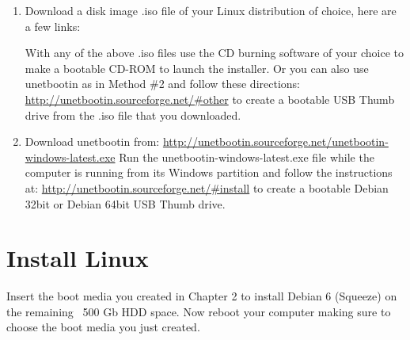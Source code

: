 \documentclass[12pt,notitlepage,onecolumn,oneside,openany]{memoir}
\begin{document}
\begin{enumerate}
\item \textsf{Download a disk image .iso file of your Linux distribution of choice, here are a few links:} 



\textsf{With any of the above .iso files use the CD burning software of your choice to make a bootable CD-ROM to launch the installer. Or you can also use unetbootin as in Method \#2 and follow these directions:} \newline
\url{http://unetbootin.sourceforge.net/#other} \newline
\textsf{to create a bootable USB Thumb drive from the .iso file that you downloaded.}

\item \textsf{Download unetbootin from:} \newline
\url{http://unetbootin.sourceforge.net/unetbootin-windows-latest.exe}\newline
\textsf{Run the unetbootin-windows-latest.exe file while the computer is running from its Windows partition and follow the instructions at:} \newline
\url{http://unetbootin.sourceforge.net/#install} \newline
\textsf{to create a bootable Debian 32bit or Debian 64bit USB Thumb drive.}
\end{enumerate}

\chapter{\textsf{Install Linux}}

\textsf{Insert the boot media you created in Chapter 2 to install Debian 6 (Squeeze) on the remaining ~500 Gb HDD space.  Now reboot your computer making sure to choose the boot media you just created.} \newline
\end{document}
